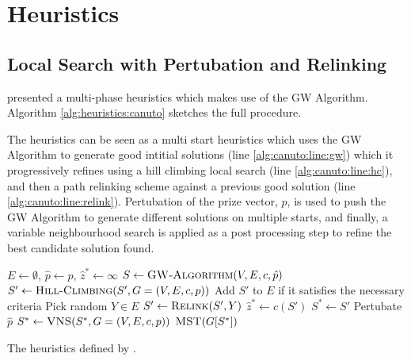 \section{Heuristics}\label{sec:solving:heuristics}

\subsection{Local Search with Pertubation and Relinking}\label{sec:canuto-search}

\citet{canuto2001local} presented a multi-phase heuristics which makes use of the GW Algorithm.
 Algorithm \ref{alg:heuristics:canuto} sketches the full procedure. 

 The heuristics can be seen as a multi start heuristics which uses the GW Algorithm
 to generate good intitial
 solutions (line \ref{alg:canuto:line:gw})
 which it progressively refines using a hill climbing local search
 (line \ref{alg:canuto:line:hc}),
 and then a path relinking scheme against a previous good solution
 (line \ref{alg:canuto:line:relink}).
 Pertubation of the prize vector, $p$, is used to push the GW Algorithm to generate
 different solutions on multiple starts, and finally, a
 variable neighbourhood search is applied as a
 post processing step to refine the best candidate solution found.

 \begin{algorithm}[h!]
   \begin{algorithmic}[1]
     \State $E \gets \emptyset$, $\hat{p} \gets p$, $\hat{z}^* \gets \infty$
     \State $S \gets \Call{GW-Algorithm}{V,E, c, \hat{p}}$ \label{alg:canuto:line:gw}
     \State $S' \gets \Call{Hill-Climbing}{S', G = (V, E, c, p)}$ \label{alg:canuto:line:hc}
     \State Add $S'$ to $E$ if it satisfies the necessary criteria \label{alg:canuto:line:elite}
     \State Pick random $Y \in E$
     \State $S' \gets \Call{Relink}{S', Y}$ \label{alg:canuto:line:relink}
     \State $\hat{z}^* \gets c(S')$
     \State $S^* \gets S'$
     \EndIf
     \EndIf
     \State Pertubate $\hat{p}$
     \EndFor
     \State $S^* \gets \Call{VNS}{S^*, G = (V, E, c, p)}$\label{alg:canuto:line:vns}
     \State \Return $\Call{MST}{G[S^*]}$
     \EndProcedure
 \end{algorithmic}
 \caption{The heuristics defined by \citet{canuto2001local}.}\label{alg:heuristics:canuto}
 \end{algorithm}

